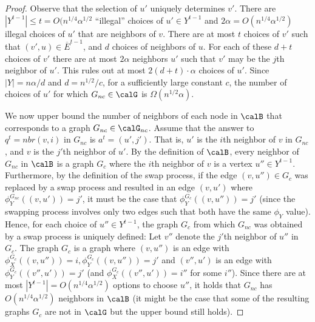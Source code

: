 \begin{proof}
    Observe that the selection of $u'$ uniquely determines $v'$. 
    There are $|Y^{t-1}| \leq t = O(n^{1/4}\alpha^{1/2}$ ``illegal'' choices of $u' \in Y^{t-1}$ and $2\alpha = O(n^{1/4}\alpha^{1/2})$ illegal choices of $u'$ that are neighbors of $v$. There are at most $t$ choices of $v'$ such that $(v',u)\in \overline{E}^{t-1}$, and $d$ choices of neighbors of $u$. For each of these $d+t$ choices of $v'$ there are at most $2\alpha$ neighbors $u'$ such that $v'$ may be the $j$th neighbor of $u'$. This rules out at most $2(d+t)\cdot\alpha$ choices of $u'$.
    Since $|Y|=n\alpha/d$   and $d = n^{1/2}/c$, for a sufficiently large constant $c$, the number of choices of $u'$ for which $G_{nc} \in \calG$ is $\Omega(n^{1/2}\alpha)$.

    We now upper bound the number of neighbors of each node  in $\calB$ that corresponds to a graph $G_{nc} \in \calG_{nc}$. 
    Assume that the answer to $q^t=nbr(v,i)$ in $G_{nc}$ is $a^t=(u',j')$. That is, $u'$ is the $i$th neighbor of $v$ in $G_{nc}$, and $v$ is the $j'$th neighbor of $u'$.
      By the definition of $\calB$, every neighbor of $G_{nc}$ in $\calB$ is a graph $G_{c}$ where the $i$th neighbor of $v$ is a vertex $u''\in Y^{t-1}$. Furthermore, by the definition of the swap process, if the edge $(v,u'')\in G_c$ was replaced by a swap process and resulted in an edge $(v,u')$ where $\phi^{G_{nc}}_Y((v,u'))=j'$, it must be the case that $\phi^{G_c}_{Y}((v,u''))=j'$ (since the swapping process  involves only two edges such that both have the same $\phi_Y$ value). Hence, for each choice of $u''\in Y^{t-1}$, the graph $G_c$ from which $G_{nc}$ was obtained by a swap process is uniquely defined: 
      Let $v''$ denote the $j'$th neighbor of $u''$ in $G_c$.
      The graph $G_c$ is a graph where  
      $(v,u'')$ is an edge with $\phi^{G_c}_{X}((v,u''))=i, \phi^{G_c}_Y((v,u''))=j'$ and $(v'', u')$ is an edge with $\phi^{G_c}_Y((v'', u'))=j'$ (and $\phi^{G_c}_X((v'', u'))=i''$ for some $i''$). Since there are at most $|Y^{t-1}|=O(n^{1/4}\alpha^{1/2})$ options to choose $u''$, it holds that $G_{nc}$ has $O(n^{1/4}\alpha^{1/2})$ neighbors in $\calB$ (it might be the case that some of the resulting graphs $G_c$ are not in 
      $\calG$
      but the upper bound still holds). 


\end{proof}
